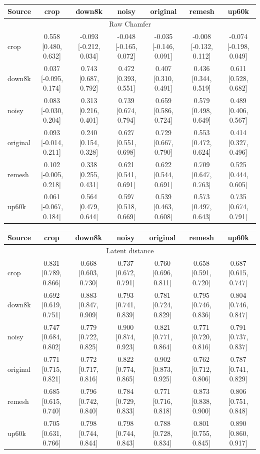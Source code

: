 \begin{tabular}{lcccccc}
\toprule
Source & crop & down8k & noisy & original & remesh & up60k \\
\midrule
\multicolumn{7}{c}{Raw Chamfer} \\
crop & 0.558 [0.480, 0.632] & -0.093 [-0.212, 0.034] & -0.048 [-0.165, 0.072] & -0.035 [-0.146, 0.091] & -0.008 [-0.132, 0.112] & -0.074 [-0.198, 0.049] \\
down8k & 0.037 [-0.095, 0.174] & 0.743 [0.687, 0.792] & 0.472 [0.393, 0.551] & 0.407 [0.310, 0.491] & 0.436 [0.344, 0.519] & 0.611 [0.528, 0.682] \\
noisy & 0.083 [-0.030, 0.204] & 0.313 [0.216, 0.401] & 0.739 [0.674, 0.794] & 0.659 [0.586, 0.724] & 0.579 [0.498, 0.649] & 0.489 [0.406, 0.567] \\
original & 0.093 [-0.014, 0.211] & 0.240 [0.154, 0.328] & 0.627 [0.551, 0.698] & 0.729 [0.667, 0.790] & 0.553 [0.472, 0.624] & 0.414 [0.327, 0.496] \\
remesh & 0.102 [-0.005, 0.218] & 0.338 [0.255, 0.431] & 0.621 [0.541, 0.691] & 0.622 [0.544, 0.691] & 0.709 [0.647, 0.763] & 0.525 [0.444, 0.605] \\
up60k & 0.061 [-0.067, 0.184] & 0.564 [0.479, 0.644] & 0.597 [0.518, 0.669] & 0.539 [0.463, 0.608] & 0.573 [0.497, 0.643] & 0.735 [0.674, 0.791] \\
\bottomrule
\end{tabular}

\begin{tabular}{lcccccc}
\toprule
Source & crop & down8k & noisy & original & remesh & up60k \\
\midrule
\multicolumn{7}{c}{Latent distance} \\
crop & 0.831 [0.789, 0.866] & 0.668 [0.603, 0.730] & 0.737 [0.672, 0.791] & 0.760 [0.696, 0.811] & 0.658 [0.591, 0.720] & 0.687 [0.615, 0.747] \\
down8k & 0.692 [0.619, 0.751] & 0.883 [0.847, 0.909] & 0.793 [0.741, 0.839] & 0.781 [0.724, 0.829] & 0.795 [0.746, 0.836] & 0.804 [0.746, 0.847] \\
noisy & 0.747 [0.684, 0.802] & 0.779 [0.722, 0.825] & 0.900 [0.874, 0.923] & 0.821 [0.771, 0.864] & 0.771 [0.720, 0.816] & 0.791 [0.737, 0.837] \\
original & 0.771 [0.715, 0.821] & 0.772 [0.717, 0.816] & 0.822 [0.774, 0.865] & 0.902 [0.873, 0.925] & 0.762 [0.712, 0.806] & 0.787 [0.741, 0.829] \\
remesh & 0.685 [0.615, 0.740] & 0.796 [0.742, 0.840] & 0.784 [0.729, 0.833] & 0.771 [0.716, 0.818] & 0.873 [0.838, 0.900] & 0.806 [0.751, 0.848] \\
up60k & 0.705 [0.631, 0.766] & 0.798 [0.744, 0.844] & 0.798 [0.744, 0.843] & 0.788 [0.728, 0.834] & 0.801 [0.755, 0.845] & 0.890 [0.860, 0.917] \\
\bottomrule
\end{tabular}
